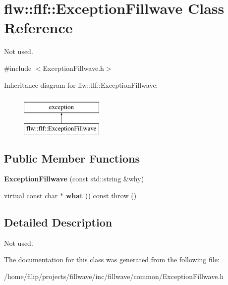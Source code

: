 \hypertarget{classflw_1_1flf_1_1ExceptionFillwave}{}\section{flw\+:\+:flf\+:\+:Exception\+Fillwave Class Reference}
\label{classflw_1_1flf_1_1ExceptionFillwave}


Not used.  




{\ttfamily \#include $<$Exception\+Fillwave.\+h$>$}

Inheritance diagram for flw\+:\+:flf\+:\+:Exception\+Fillwave\+:\begin{figure}[H]
\begin{center}
\leavevmode
\includegraphics[height=2.000000cm]{classflw_1_1flf_1_1ExceptionFillwave}
\end{center}
\end{figure}
\subsection*{Public Member Functions}
\begin{DoxyCompactItemize}
\item 
\mbox{\label{classflw_1_1flf_1_1ExceptionFillwave_a342a4c65c3bf2b3cff8d0d161e637912}} 
{\bfseries Exception\+Fillwave} (const std\+::string \&why)
\item 
\mbox{\label{classflw_1_1flf_1_1ExceptionFillwave_ae62574fc52459015e779cc7026f965ce}} 
virtual const char $\ast$ {\bfseries what} () const  throw ()
\end{DoxyCompactItemize}


\subsection{Detailed Description}
Not used. 

The documentation for this class was generated from the following file\+:\begin{DoxyCompactItemize}
\item 
/home/filip/projects/fillwave/inc/fillwave/common/Exception\+Fillwave.\+h\end{DoxyCompactItemize}
